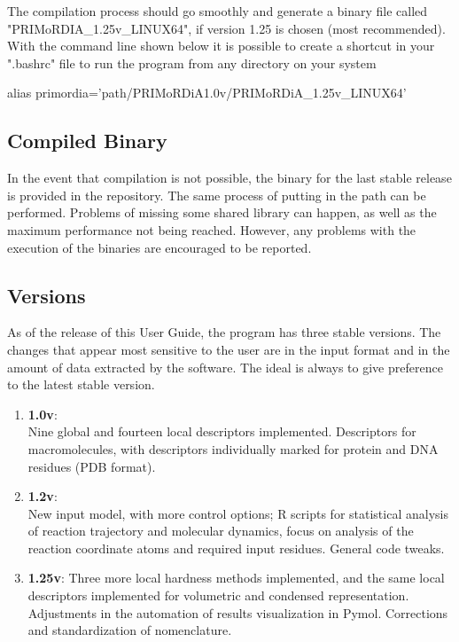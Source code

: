 \documentclass[a4paper,11pt]{refart}
\begin{document}
	The compilation process should go smoothly and generate a binary file called "PRIMoRDIA\_1.25v\_LINUX64", if version 1.25 is chosen (most recommended).
	With the command line shown below it is possible to create a shortcut in your ".bashrc" file to run the program from any directory on your system

\hspace*{-\leftmarginwidth}
\begin{minipage}{\fullwidth}
\begin{commandshell}
alias primordia='path/PRIMoRDiA1.0v/PRIMoRDiA\_1.25v\_LINUX64'
\end{commandshell}
\end{minipage}

	\subsection{Compiled Binary}

	In the event that compilation is not possible, the binary for the last stable release is provided in the repository. The same process of putting in the path can be performed. Problems of missing some shared library can happen, as well as the maximum performance not being reached. However, any problems with the execution of the binaries are encouraged to be reported.

	\subsection{Versions}

	As of the release of this User Guide, the program has three stable versions.
	The changes that appear most sensitive to the user are in the input format and in the amount of data extracted by the software. The ideal is always to give preference to the latest stable version.

	\begin{enumerate}
		\item \textbf{1.0v}:\\
		Nine global and fourteen local descriptors implemented. Descriptors for macromolecules, with descriptors individually marked for protein and DNA residues (PDB format).
		\item \textbf{1.2v}:
		\\ New input model, with more control options; R scripts for statistical analysis of reaction trajectory and molecular dynamics, focus on analysis of the reaction coordinate atoms and required input residues. General code tweaks.
		\item \textbf{1.25v}: Three more local hardness methods implemented, and the same local descriptors implemented for volumetric and condensed representation. Adjustments in the automation of results visualization in Pymol. Corrections and standardization of nomenclature.
	\end{enumerate}
\end{document}
